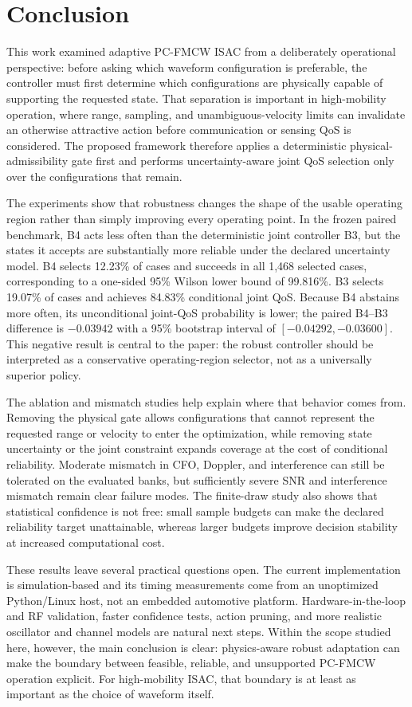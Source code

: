 \section{Conclusion}
\label{sec:conclusion}

This work examined adaptive PC-FMCW ISAC from a deliberately operational perspective: before asking which waveform configuration is preferable, the controller must first determine which configurations are physically capable of supporting the requested state. That separation is important in high-mobility operation, where range, sampling, and unambiguous-velocity limits can invalidate an otherwise attractive action before communication or sensing QoS is considered. The proposed framework therefore applies a deterministic physical-admissibility gate first and performs uncertainty-aware joint QoS selection only over the configurations that remain.

The experiments show that robustness changes the shape of the usable operating region rather than simply improving every operating point. In the frozen paired benchmark, B4 acts less often than the deterministic joint controller B3, but the states it accepts are substantially more reliable under the declared uncertainty model. B4 selects 12.23\% of cases and succeeds in all 1,468 selected cases, corresponding to a one-sided 95\% Wilson lower bound of 99.816\%. B3 selects 19.07\% of cases and achieves 84.83\% conditional joint QoS. Because B4 abstains more often, its unconditional joint-QoS probability is lower; the paired B4--B3 difference is $-0.03942$ with a 95\% bootstrap interval of $[-0.04292,-0.03600]$. This negative result is central to the paper: the robust controller should be interpreted as a conservative operating-region selector, not as a universally superior policy.

The ablation and mismatch studies help explain where that behavior comes from. Removing the physical gate allows configurations that cannot represent the requested range or velocity to enter the optimization, while removing state uncertainty or the joint constraint expands coverage at the cost of conditional reliability. Moderate mismatch in CFO, Doppler, and interference can still be tolerated on the evaluated banks, but sufficiently severe SNR and interference mismatch remain clear failure modes. The finite-draw study also shows that statistical confidence is not free: small sample budgets can make the declared reliability target unattainable, whereas larger budgets improve decision stability at increased computational cost.

These results leave several practical questions open. The current implementation is simulation-based and its timing measurements come from an unoptimized Python/Linux host, not an embedded automotive platform. Hardware-in-the-loop and RF validation, faster confidence tests, action pruning, and more realistic oscillator and channel models are natural next steps. Within the scope studied here, however, the main conclusion is clear: physics-aware robust adaptation can make the boundary between feasible, reliable, and unsupported PC-FMCW operation explicit. For high-mobility ISAC, that boundary is at least as important as the choice of waveform itself.
